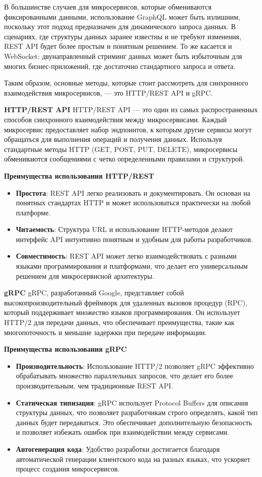 В большинстве случаев для микросервисов, которые обмениваются фиксированными данными, использование GraphQL 
может быть излишним, поскольку этот подход предназначен для динамического запроса данных. В сценариях, 
где структуры данных заранее известны и не требуют изменения, REST API будет более простым и 
понятным решением. То же касается и WebSocket: двунаправленный стриминг данных может быть избыточным для 
многих бизнес-приложений, где достаточно стандартного запроса и ответа.

Таким образом, основные методы, которые стоит рассмотреть для синхронного взаимодействия микросервисов, — 
это HTTP/REST API и gRPC.


\textbf{HTTP/REST API}
HTTP/REST API — это один из самых распространенных способов синхронного взаимодействия между микросервисами. Каждый микросервис предоставляет набор эндпоинтов, к которым другие сервисы могут обращаться для выполнения операций и получения данных. Используя стандартные методы HTTP (GET, POST, PUT, DELETE), микросервисы обмениваются сообщениями с четко определенными правилами и структурой.


\textbf{Преимущества использования HTTP/REST}
\begin{itemize}
    \item \textbf{Простота}: REST API легко реализовать и документировать. Он основан на понятных стандартах HTTP и может использоваться практически на любой платформе.
    \item \textbf{Читаемость}: Структура URL и использование HTTP-методов делают интерфейс API интуитивно понятным и удобным для работы разработчиков.
    \item \textbf{Совместимость}: REST API может легко взаимодействовать с разными языками программирования и платформами, что делает его универсальным решением для микросервисной архитектуры.
\end{itemize}


\textbf{gRPC}
gRPC, разработанный Google, представляет собой высокопроизводительный фреймворк для удаленных вызовов процедур (RPC), который поддерживает множество языков программирования. Он использует HTTP/2 для передачи данных, что обеспечивает преимущества, такие как многопоточность и меньшие задержки при передаче информации.


\textbf{Преимущества использования gRPC}
\begin{itemize}
    \item \textbf{Производительность}: Использование HTTP/2 позволяет gRPC эффективно обрабатывать множество параллельных запросов, что делает его более производительным, чем традиционные REST API.
    \item \textbf{Статическая типизация}: gRPC использует Protocol Buffers для описания структуры данных, что позволяет разработчикам строго определять, какой тип данных будет передаваться. Это обеспечивает дополнительную безопасность и позволяет избежать ошибок при взаимодействии между сервисами.
    \item \textbf{Автогенерация кода}: Удобство разработки достигается благодаря автоматической генерации клиентского кода на разных языках, что ускоряет процесс создания микросервисов.
\end{itemize}


